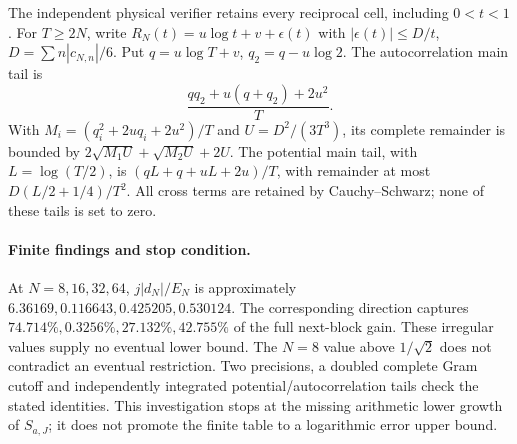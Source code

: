 The independent physical verifier retains every reciprocal cell, including
$0<t<1$. For $T\ge2N$, write
$R_N(t)=u\log t+v+\epsilon(t)$ with $|\epsilon(t)|\le D/t$,
$D=\sum n|c_{N,n}|/6$. Put $q=u\log T+v$, $q_2=q-u\log2$.
The autocorrelation main tail is
\[
 \frac{qq_2+u(q+q_2)+2u^2}{T}.
\]
With $M_i=(q_i^2+2uq_i+2u^2)/T$ and $U=D^2/(3T^3)$,
its complete remainder is bounded by
$2\sqrt{M_1U}+\sqrt{M_2U}+2U$.
The potential main tail, with $L=\log(T/2)$, is
$(qL+q+uL+2u)/T$, with remainder at most $D(L/2+1/4)/T^2$.
All cross terms are retained by Cauchy--Schwarz; none of these tails is set to zero.

\paragraph{Finite findings and stop condition.}
At $N=8,16,32,64$, $j|d_N|/E_N$ is approximately
$6.36169,0.116643,0.425205,0.530124$. The corresponding direction captures
$74.714\%,0.3256\%,27.132\%,42.755\%$ of the full next-block gain.
These irregular values supply no eventual lower bound. The $N=8$ value
above $1/\sqrt2$ does not contradict an eventual restriction.
Two precisions, a doubled complete Gram cutoff and independently integrated
potential/autocorrelation tails check the stated identities.
This investigation stops at the missing arithmetic lower growth of $S_{a,J}$;
it does not promote the finite table to a logarithmic error upper bound.

